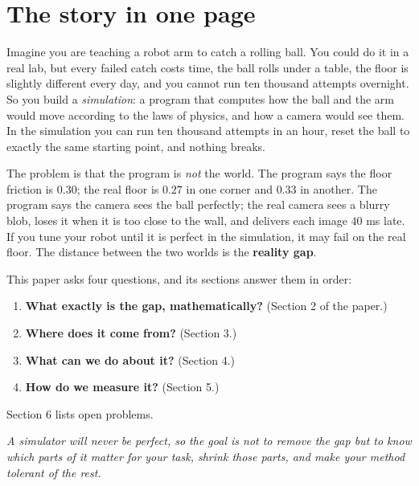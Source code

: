 \documentclass[11pt,a4paper]{article}
\begin{document}
\tableofcontents
\newpage

\section{The story in one page}

Imagine you are teaching a robot arm to catch a rolling ball. You could do it in a real lab, but
every failed catch costs time, the ball rolls under a table, the floor is slightly different
every day, and you cannot run ten thousand attempts overnight. So you build a \emph{simulation}:
a program that computes how the ball and the arm would move according to the laws of physics,
and how a camera would see them. In the simulation you can run ten thousand attempts in an hour,
reset the ball to exactly the same starting point, and nothing breaks.

The problem is that the program is \emph{not} the world. The program says the floor friction is
$0.30$; the real floor is $0.27$ in one corner and $0.33$ in another. The program says the camera
sees the ball perfectly; the real camera sees a blurry blob, loses it when it is too close to the
wall, and delivers each image $40$ ms late. If you tune your robot until it is perfect in the
simulation, it may fail on the real floor. The distance between the two worlds is the
\textbf{reality gap}.

This paper asks four questions, and its sections answer them in order:
\begin{enumerate}
\item \textbf{What exactly is the gap, mathematically?} (Section 2 of the paper.)
\item \textbf{Where does it come from?} (Section 3.)
\item \textbf{What can we do about it?} (Section 4.)
\item \textbf{How do we measure it?} (Section 5.)
\end{enumerate}
Section 6 lists open problems.

\begin{idea}
\emph{A simulator will never be perfect, so the goal is not to remove the gap but to know which
parts of it matter for your task, shrink those parts, and make your method tolerant of the rest.}
\end{idea}
\end{document}
